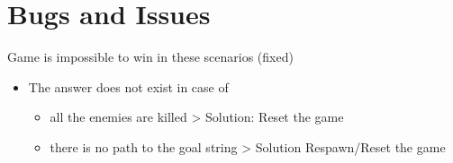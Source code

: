 \documentclass{article}
\begin{document}
\newpage

\section{Bugs and Issues}
Game is impossible to win in these scenarios (fixed)
\begin{itemize}
    \item The answer does not exist in case of
    \begin{itemize}
        \item all the enemies are killed > Solution: Reset the game
        \item there is no path to the goal string > Solution Respawn/Reset the game
    \end{itemize}
\end{itemize}
\end{document}
